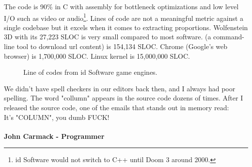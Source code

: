 \documentclass[book.tex]{subfiles}
\begin{document}
\par
 The code is 90\% in C with assembly for bottleneck optimizations and low level I/O such as video or audio\footnote{id Software would not switch to C++ until Doom 3 around 2000.}. Lines of code are not a meaningful metric against a single codebase but it excels when it comes to extracting proportions. Wolfenstein 3D with its 27,223 SLOC is very small compared to most software.  (a command-line tool to download url content) is 154,134 SLOC. Chrome (Google's web browser) is 1,700,000 SLOC. Linux kernel is 15,000,000 SLOC.\\
\par
\begin{figure}[H]
\centering
   \caption{Line of codes from id Software game engines.}
 \end{figure}
 
\par

 \begin{fancyquotes}
   We didn't have spell checkers in our editors back then, and I always had poor spelling.  The word "collumn" appears in the source code dozens of times.  After I released the source code, one of the emails that stands out in memory read:
 \bigskip \\
It's "COLUMN", you dumb FUCK!\\
 \bigskip \\
\textbf{John Carmack - Programmer}
 \end{fancyquotes}
 
\end{document}

